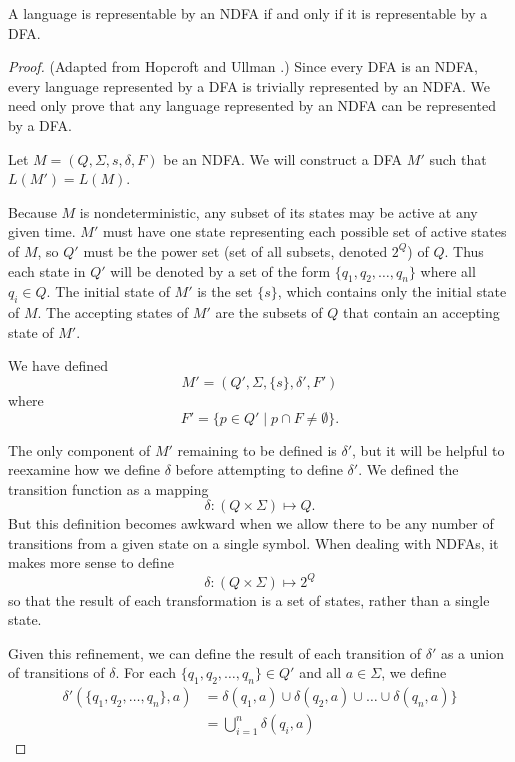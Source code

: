 \documentclass{bcthesis}
\newcommand{\footcite}[2]{\xspace\cite[pg.~{#2}]{#1}\xspace}
\begin{document}
	\begin{claim}
	\label{prop:ndfa_dfa_equivalent}
		A language is representable by an NDFA if and only if it is representable by a DFA.
	\end{claim}
	\begin{proof}
	\label{proof:ndfa_dfa_equivalent}
		(Adapted from Hopcroft and Ullman \footcite{hopcroft}{22}.)
		Since every DFA is an NDFA, every language represented by a DFA is trivially represented by an NDFA.
		We need only prove that any language represented by an NDFA can be represented by a DFA.

		Let $M = (Q, \Sigma, s, \delta, F)$ be an NDFA.
		We will construct a DFA $M'$ such that $L(M') = L(M)$.

		Because $M$ is nondeterministic, any subset of its states may be active at any given time.
		$M'$ must have one state representing each possible set of active states of $M$, so $Q'$ must be the power set (set of all subsets, denoted $2^Q$) of $Q$.
		Thus each state in $Q'$ will be denoted by a set of the form $\{ q_1, q_2, \dots, q_n \}$ where all $q_i \in Q$.
		The initial state of $M'$ is the set $\{ s \}$, which contains only the initial state of $M$.
		The accepting states of $M'$ are the subsets of $Q$ that contain an accepting state of $M'$.

		We have defined
		\[
			M' = (Q', \Sigma, \{s\}, \delta', F')
		\]
		where
		\[
			F' = \{ p \in Q' \mid p \cap F \neq \emptyset\}.
		\]

		The only component of $M'$ remaining to be defined is $\delta'$, but it will be helpful to reexamine how we define $\delta$ before attempting to define $\delta'$.
		We defined the transition function as a mapping 
		\[
			\delta : (Q \times \Sigma) \mapsto Q.
		\]
		But this definition becomes awkward when we allow there to be any number of transitions from a given state on a single symbol.
		When dealing with NDFAs, it makes more sense to define
		\[
			\delta : (Q \times \Sigma) \mapsto 2^Q
		\]
		so that the result of each transformation is a set of states, rather than a single state.

		Given this refinement, we can define the result of each transition of $\delta'$ as a union of transitions of $\delta$.
		For each $\{ q_1, q_2, \dots, q_n \} \in Q'$ and all $a \in \Sigma$, we define
		\begin{align*}
			\delta'(\{ q_1, q_2, \dots, q_n \}, a) &= \delta(q_1, a) \cup \delta(q_2, a) \cup \dots \cup \delta(q_n, a) \} \\
			&= \bigcup_{i=1}^n \delta(q_i, a)
		\end{align*}
		

\end{proof}
\end{document}
